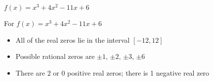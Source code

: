{$f(x) = x^{3} + 4x^{2} - 11x + 6$}
{For  $f(x) = x^{3} + 4x^{2} - 11x + 6$
\begin{itemize}
\item  All of the real zeros lie in the interval $[-12,12]$
\item  Possible rational zeros are $\pm 1$, $\pm 2$, $\pm 3$, $\pm 6$
\item  There are 2 or 0 positive real zeros;  there is 1 negative real zero
\end{itemize}
}